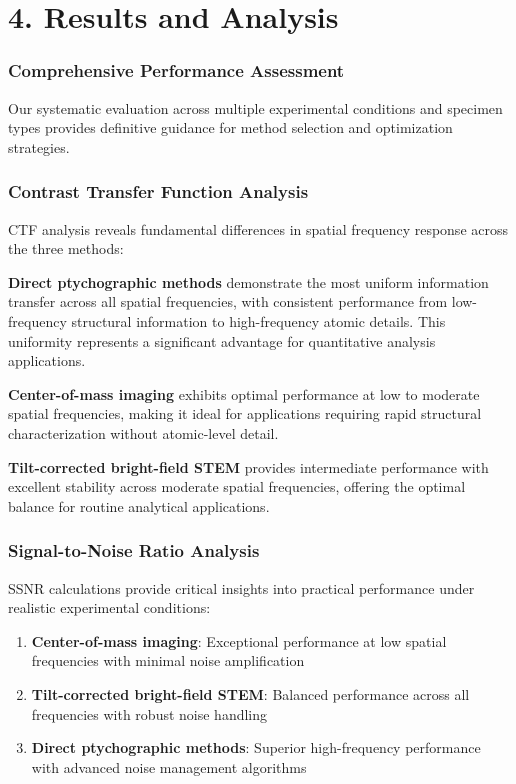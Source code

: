 \documentclass[
  letterpaper,
]{book}
\providecommand{\tightlist}{%
  \setlength{\itemsep}{0pt}\setlength{\parskip}{0pt}}
\begin{document}
\chapter{4. Results and Analysis}\label{results-and-analysis-1}

\subsection{Comprehensive Performance
Assessment}\label{comprehensive-performance-assessment}

Our systematic evaluation across multiple experimental conditions and
specimen types provides definitive guidance for method selection and
optimization strategies.

\subsection{Contrast Transfer Function
Analysis}\label{contrast-transfer-function-analysis}

CTF analysis reveals fundamental differences in spatial frequency
response across the three methods:

\textbf{Direct ptychographic methods} demonstrate the most uniform
information transfer across all spatial frequencies, with consistent
performance from low-frequency structural information to high-frequency
atomic details. This uniformity represents a significant advantage for
quantitative analysis applications.

\textbf{Center-of-mass imaging} exhibits optimal performance at low to
moderate spatial frequencies, making it ideal for applications requiring
rapid structural characterization without atomic-level detail.

\textbf{Tilt-corrected bright-field STEM} provides intermediate
performance with excellent stability across moderate spatial
frequencies, offering the optimal balance for routine analytical
applications.

\subsection{Signal-to-Noise Ratio
Analysis}\label{signal-to-noise-ratio-analysis}

SSNR calculations provide critical insights into practical performance
under realistic experimental conditions:

\begin{enumerate}
\def\labelenumi{\arabic{enumi}.}
\tightlist
\item
  \textbf{Center-of-mass imaging}: Exceptional performance at low
  spatial frequencies with minimal noise amplification
\item
  \textbf{Tilt-corrected bright-field STEM}: Balanced performance across
  all frequencies with robust noise handling
\item
  \textbf{Direct ptychographic methods}: Superior high-frequency
  performance with advanced noise management algorithms
\end{enumerate}
\end{document}
